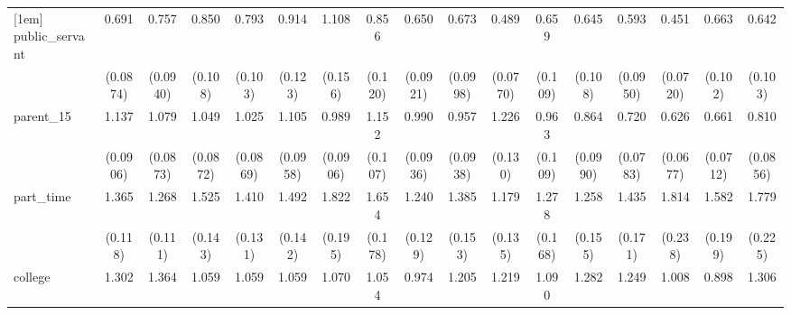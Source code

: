 {\begin{tabular}{l*{16}{c}}
[1em]
public\_servant      &       0.691\sym{**} &       0.757\sym{*}  &       0.850         &       0.793         &       0.914         &       1.108         &       0.856         &       0.650\sym{**} &       0.673\sym{**} &       0.489\sym{***}&       0.659\sym{*}  &       0.645\sym{**} &       0.593\sym{**} &       0.451\sym{***}&       0.663\sym{**} &       0.642\sym{**} \\
                    &    (0.0874)         &    (0.0940)         &     (0.108)         &     (0.103)         &     (0.123)         &     (0.156)         &     (0.120)         &    (0.0921)         &    (0.0998)         &    (0.0770)         &     (0.109)         &     (0.108)         &    (0.0950)         &    (0.0720)         &     (0.102)         &     (0.103)         \\
[1em]
parent\_15           &       1.137         &       1.079         &       1.049         &       1.025         &       1.105         &       0.989         &       1.152         &       0.990         &       0.957         &       1.226         &       0.963         &       0.864         &       0.720\sym{**} &       0.626\sym{***}&       0.661\sym{***}&       0.810\sym{*}  \\
                    &    (0.0906)         &    (0.0873)         &    (0.0872)         &    (0.0869)         &    (0.0958)         &    (0.0906)         &     (0.107)         &    (0.0936)         &    (0.0938)         &     (0.130)         &     (0.109)         &    (0.0990)         &    (0.0783)         &    (0.0677)         &    (0.0712)         &    (0.0856)         \\
[1em]
part\_time           &       1.365\sym{***}&       1.268\sym{**} &       1.525\sym{***}&       1.410\sym{***}&       1.492\sym{***}&       1.822\sym{***}&       1.654\sym{***}&       1.240\sym{*}  &       1.385\sym{**} &       1.179         &       1.278         &       1.258         &       1.435\sym{**} &       1.814\sym{***}&       1.582\sym{***}&       1.779\sym{***}\\
                    &     (0.118)         &     (0.111)         &     (0.143)         &     (0.131)         &     (0.142)         &     (0.195)         &     (0.178)         &     (0.129)         &     (0.153)         &     (0.135)         &     (0.168)         &     (0.155)         &     (0.171)         &     (0.238)         &     (0.199)         &     (0.225)         \\
[1em]
college             &       1.302\sym{**} &       1.364\sym{**} &       1.059         &       1.059         &       1.059         &       1.070         &       1.054         &       0.974         &       1.205         &       1.219         &       1.090         &       1.282         &       1.249         &       1.008         &       0.898         &       1.306\sym{*}  \\

\end{tabular}}
